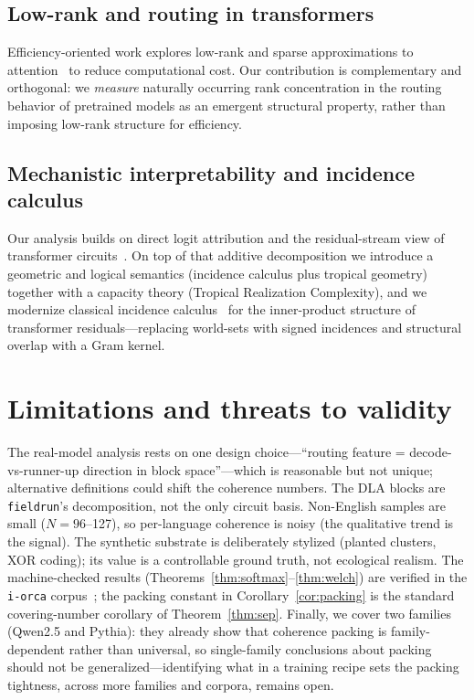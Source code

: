 \documentclass[sigconf,nonacm]{acmart}
\theoremstyle{definition}
\begin{document}
\subsection{Low-rank and routing in transformers}
Efficiency-oriented work explores low-rank and sparse approximations to
attention~\cite{chen2021scatterbrain} to reduce computational cost. Our contribution
is complementary and orthogonal: we \emph{measure} naturally occurring rank
concentration in the routing behavior of pretrained models as an emergent structural
property, rather than imposing low-rank structure for efficiency.

\subsection{Mechanistic interpretability and incidence calculus}
Our analysis builds on direct logit attribution and the residual-stream view of
transformer circuits~\cite{elhage2021framework,nostalgebraist2020logitlens}. On top
of that additive decomposition we introduce a geometric and logical semantics
(incidence calculus plus tropical geometry) together with a capacity theory
(Tropical Realization Complexity), and we modernize classical incidence
calculus~\cite{bundy1985incidence,liu1996incidence} for the inner-product structure
of transformer residuals---replacing world-sets with signed incidences and
structural overlap with a Gram kernel.

\section{Limitations and threats to validity}

The real-model analysis rests on one design choice---``routing feature =
decode-vs-runner-up direction in block space''---which is reasonable but not unique;
alternative definitions could shift the coherence numbers. The DLA blocks are
\texttt{fieldrun}'s decomposition, not the only circuit basis. Non-English samples
are small ($N{=}96$--127), so per-language coherence is noisy (the qualitative trend
is the signal). The synthetic substrate is deliberately stylized (planted clusters,
XOR coding); its value is a controllable ground truth, not ecological realism. The
machine-checked results (Theorems~\ref{thm:softmax}--\ref{thm:welch}) are verified in
the \texttt{i-orca} corpus~\cite{iorca}; the packing constant in
Corollary~\ref{cor:packing} is the standard covering-number corollary of
Theorem~\ref{thm:sep}. Finally, we cover two families (Qwen2.5 and Pythia): they
already show that coherence packing is family-dependent rather than universal, so
single-family conclusions about packing should not be generalized---identifying what
in a training recipe sets the packing tightness, across more families and corpora,
remains open.
\end{document}
